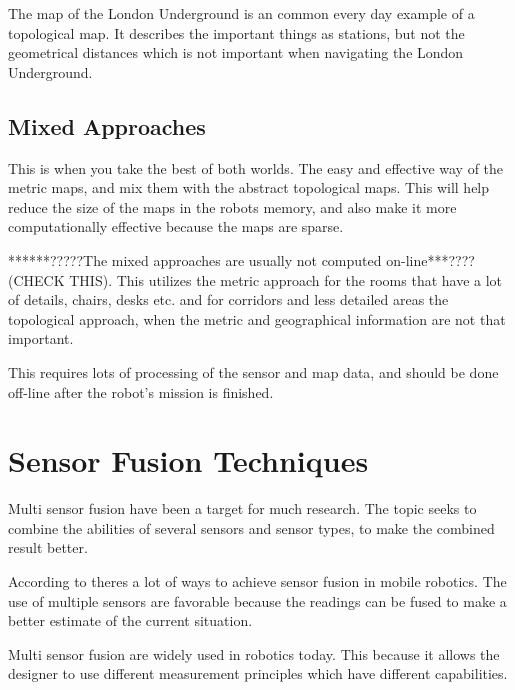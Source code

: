 The map of the London Underground is an common every day example of a topological map. It describes
the important things as stations, but not the geometrical distances which is not important
when navigating the London Underground. 


\subsection{Mixed Approaches}
This is when you take the best of both worlds. The easy and effective way of the metric
maps, and mix them with the abstract topological maps. This will help reduce the size of
the maps in the robots memory, and also make it more computationally effective because the
maps are sparse. 

******?????The mixed approaches are usually not computed on-line***???? (CHECK THIS). This utilizes
the metric approach for the rooms that have a lot of details, chairs, desks etc. and for
corridors and less detailed areas the topological approach, when the metric and
geographical information are not that important. 

This requires lots of processing of the sensor and map data, and should be done off-line
after the robot's mission is finished. 
\cite{thrun}

\section{Sensor Fusion Techniques}
Multi sensor fusion have been a target for much research. The topic seeks to combine the
abilities of several sensors and sensor types, to make the combined result better. 


According to \cite{sensor-fusion-mobile-robots} theres a lot of ways to achieve sensor
fusion in mobile robotics. The use of multiple sensors are favorable because the readings
can be fused to make a better estimate of the current situation. 

Multi sensor fusion are widely used in robotics today. This because it allows the designer
to use different measurement principles which have different capabilities. 


